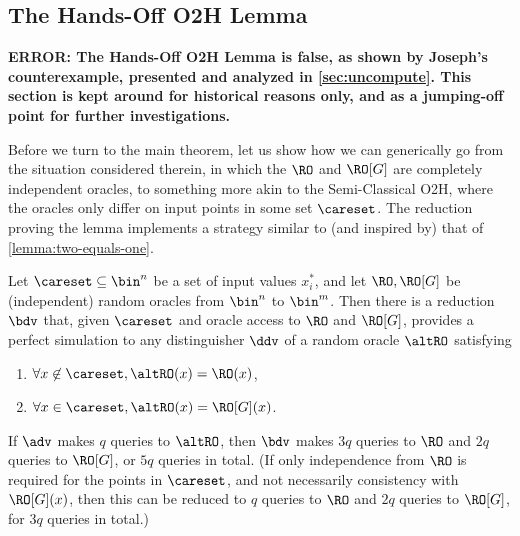 

  \subsection{The Hands-Off O2H Lemma}
    \textbf{ERROR: The Hands-Off O2H Lemma is false, as shown by Joseph's
      counterexample, presented and analyzed in \autoref{sec:uncompute}.
      This section is kept around for historical reasons only,
      and as a jumping-off point for further investigations.}

    Before we turn to the main theorem, let us show how we can generically go from the
      situation considered therein, in which the $\RO$ and
      $\RO[G]$ are completely independent oracles, to something more akin to the
      Semi-Classical O2H, where the oracles only differ on input points in some set
      $\careset$. The reduction proving the lemma implements a strategy similar
      to (and inspired by) that of \autoref{lemma:two-equals-one}.

    \begin{lemma}
      Let $\careset \subseteq \bin^n$ be a set of input values $x^*_i$, and
        let $\RO, \RO[G]$ be (independent) random oracles from $\bin^n$ to $\bin^m$. Then
        there is a reduction $\bdv$ that, given $\careset$ and oracle access to
        $\RO$ and $\RO[G]$, provides a perfect
        simulation to any distinguisher $\ddv$ of a random oracle
        $\altRO$ satisfying
        \begin{enumerate}
          \item $\forall x \not\in \careset, \altRO(x) = \RO(x)$, 
          \item $\forall x \in \careset, \altRO(x) = \RO[G](x)$. 
        \end{enumerate}

      \noindent
      If $\adv$ makes $q$ queries to $\altRO$, then $\bdv$ makes $3q$ queries
        to $\RO$ and $2q$ queries to $\RO[G]$, or $5q$ queries in total.
        (If only independence from $\RO$ is required for the points in
        $\careset$, and not necessarily consistency
        with $\RO[G](x)$, then this can be reduced to $q$ queries to $\RO$ and
        $2q$ queries to $\RO[G]$, for $3q$ queries in total.)
    \end{lemma}

